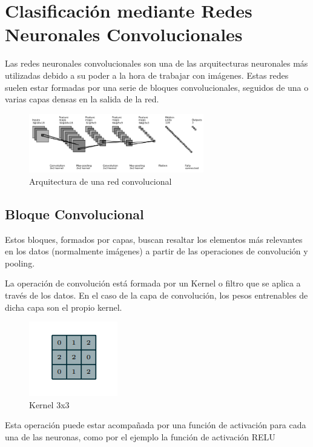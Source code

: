 
\section{Clasificación mediante Redes Neuronales
Convolucionales}\label{}

Las redes neuronales convolucionales son una de las arquitecturas
neuronales más utilizadas debido a su poder a la hora de trabajar con
imágenes. Estas redes suelen estar formadas por una serie de bloques
convolucionales, seguidos de una o varias capas densas en la salida de
la red.

\begin{figure}
\centering
\includegraphics[width=2.99679in,height=1.01667in]{img/memoria/3/cnn.png}
\caption{Arquitectura de una red convolucional }
\end{figure}
\hypertarget{bloque-convolucional}{%
\subsection{Bloque Convolucional}\label{bloque-convolucional}}

Estos bloques, formados por capas, buscan resaltar los elementos más
relevantes en los datos (normalmente imágenes) a partir de las
operaciones de convolución y pooling.

La operación de convolución está formada por un Kernel o filtro que se
aplica a través de los datos. En el caso de la capa de convolución, los
pesos entrenables de dicha capa son el propio kernel.

\begin{figure}
\centering
    \includegraphics[]{img/memoria/3/kernel.png}
    \caption{Kernel 3x3}
\end{figure}

Esta operación puede estar acompañada por una función de activación para
cada una de las neuronas, como por el ejemplo la función de activación
RELU



